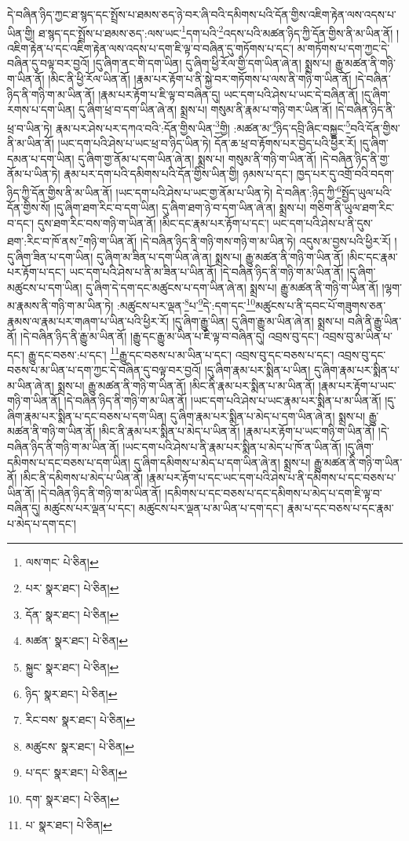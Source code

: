 དེ་བཞིན་ཉིད་ཀྱང་ཐ་སྙད་དང་སྤྲོས་པ་ཐམས་ཅད་ཉེ་བར་ཞི་བའི་དམིགས་པའི་དོན་གྱིས་འཇིག་རྟེན་ལས་འདས་པ་ཡིན་གྱི། ཐ་སྙད་དང་སྤྲོས་པ་ཐམས་ཅད་:ལས་ཡང་\footnote{ལས་གང་  པེ་ཅིན། }དག་པའི་\footnote{པར་  སྣར་ཐང་།  པེ་ཅིན། }འདས་པའི་མཚན་ཉིད་ཀྱི་དོན་གྱིས་ནི་མ་ཡིན་ནོ། །འཇིག་རྟེན་པ་དང་འཇིག་རྟེན་ལས་འདས་པ་དག་ཇི་ལྟ་བ་བཞིན་དུ་གཏོགས་པ་དང་། མ་གཏོགས་པ་དག་ཀྱང་དེ་བཞིན་དུ་བལྟ་བར་བྱའོ། །དུ་ཞིག་ནང་གི་དག་ཡིན། དུ་ཞིག་ཕྱི་རོལ་གྱི་དག་ཡིན་ཞེ་ན། སྨྲས་པ། རྒྱུ་མཚན་ནི་གཉི་ག་ཡིན་ནོ། །མིང་ནི་ཕྱི་རོལ་ཡིན་ནོ། །རྣམ་པར་རྟོག་པ་ནི་སྐྱེ་བར་གཏོགས་པ་ལས་ནི་གཉི་ག་ཡིན་ནོ། །དེ་བཞིན་ཉིད་ནི་གཉི་ག་མ་ཡིན་ནོ། །རྣམ་པར་རྟོག་པ་ཇི་ལྟ་བ་བཞིན་དུ། ཡང་དག་པའི་ཤེས་པ་ཡང་དེ་བཞིན་ནོ། །དུ་ཞིག་རགས་པ་དག་ཡིན། དུ་ཞིག་ཕྲ་བ་དག་ཡིན་ཞེ་ན། སྨྲས་པ། གསུམ་ནི་རྣམ་པ་གཉི་གར་ཡིན་ནོ། །དེ་བཞིན་ཉིད་ནི་ཕྲ་བ་ཡིན་ཏེ། རྣམ་པར་ཤེས་པར་དཀའ་བའི་:དོན་གྱིས་ཡིན་\footnote{དོན་  སྣར་ཐང་།  པེ་ཅིན། }གྱི། :མཚན་མ་\footnote{མཚན་  སྣར་ཐང་།  པེ་ཅིན། }ཉིད་དབྲི་ཞིང་བསྐྱུང་\footnote{སྐྱུང་  སྣར་ཐང་།  པེ་ཅིན། }བའི་དོན་གྱིས་ནི་མ་ཡིན་ནོ། །ཡང་དག་པའི་ཤེས་པ་ཡང་ཕྲ་བ་ཉིད་ཡིན་ཏེ། དོན་ཆ་ཕྲ་བ་རྟོགས་པར་བྱེད་པའི་ཕྱིར་རོ། །དུ་ཞིག་དམན་པ་དག་ཡིན། དུ་ཞིག་གྱ་ནོམ་པ་དག་ཡིན་ཞེ་ན། སྨྲས་པ། གསུམ་ནི་གཉི་ག་ཡིན་ནོ། །དེ་བཞིན་ཉིད་ནི་གྱ་ནོམ་པ་ཡིན་ཏེ། རྣམ་པར་དག་པའི་དམིགས་པའི་དོན་གྱིས་ཡིན་གྱི། ཉམས་པ་དང་། ཁྱད་པར་དུ་འགྲོ་བའི་བདག་ཉིད་ཀྱི་དོན་གྱིས་ནི་མ་ཡིན་ནོ། །ཡང་དག་པའི་ཤེས་པ་ཡང་གྱ་ནོམ་པ་ཡིན་ཏེ། དེ་བཞིན་:ཉིད་ཀྱི་\footnote{ཉིད་  སྣར་ཐང་།  པེ་ཅིན། }སྤྱོད་ཡུལ་པའི་དོན་གྱིས་སོ། །དུ་ཞིག་ཐག་རིང་བ་དག་ཡིན། དུ་ཞིག་ཐག་ཉེ་བ་དག་ཡིན་ཞེ་ན། སྨྲས་པ། གཅིག་ནི་ཡུལ་ཐག་རིང་བ་དང་། དུས་ཐག་རིང་བས་གཉི་ག་ཡིན་ནོ། །མིང་དང་རྣམ་པར་རྟོག་པ་དང་། ཡང་དག་པའི་ཤེས་པ་ནི་དུས་ཐག་:རིང་བ་ཁོ་ནས་\footnote{རིང་བས་  སྣར་ཐང་།  པེ་ཅིན། }གཉི་ག་ཡིན་ནོ། །དེ་བཞིན་ཉིད་ནི་གཉི་གས་གཉི་ག་མ་ཡིན་ཏེ། འདུས་མ་བྱས་པའི་ཕྱིར་རོ། །དུ་ཞིག་ཟིན་པ་དག་ཡིན། དུ་ཞིག་མ་ཟིན་པ་དག་ཡིན་ཞེ་ན། སྨྲས་པ། རྒྱུ་མཚན་ནི་གཉི་ག་ཡིན་ནོ། །མིང་དང་རྣམ་པར་རྟོག་པ་དང་། ཡང་དག་པའི་ཤེས་པ་ནི་མ་ཟིན་པ་ཡིན་ནོ། །དེ་བཞིན་ཉིད་ནི་གཉི་ག་མ་ཡིན་ནོ། །དུ་ཞིག་མཚུངས་པ་དག་ཡིན། དུ་ཞིག་དེ་དག་དང་མཚུངས་པ་དག་ཡིན་ཞེ་ན། སྨྲས་པ། རྒྱུ་མཚན་ནི་གཉི་ག་ཡིན་ནོ། །ལྷག་མ་རྣམས་ནི་གཉི་ག་མ་ཡིན་ཏེ། :མཚུངས་པར་ལྡན་\footnote{མཚུངས་  སྣར་ཐང་།  པེ་ཅིན། }པ་\footnote{པ་དང་  སྣར་ཐང་།  པེ་ཅིན། }དེ་:དག་དང་\footnote{དག་  སྣར་ཐང་།  པེ་ཅིན། }མཚུངས་པ་ནི་དབང་པོ་གཟུགས་ཅན་རྣམས་ལ་རྣམ་པར་གཞག་པ་ཡིན་པའི་ཕྱིར་རོ། །དུ་ཞིག་རྒྱུ་ཡིན། དུ་ཞིག་རྒྱུ་མ་ཡིན་ཞེ་ན། སྨྲས་པ། བཞི་ནི་རྒྱུ་ཡིན་ནོ། །དེ་བཞིན་ཉིད་ནི་རྒྱུ་མ་ཡིན་ནོ། །རྒྱུ་དང་རྒྱུ་མ་ཡིན་པ་ཇི་ལྟ་བ་བཞིན་དུ། འབྲས་བུ་དང་། འབྲས་བུ་མ་ཡིན་པ་དང་། རྒྱུ་དང་བཅས་:པ་དང་། \footnote{པ་  སྣར་ཐང་།  པེ་ཅིན། }རྒྱུ་དང་བཅས་པ་མ་ཡིན་པ་དང་། འབྲས་བུ་དང་བཅས་པ་དང་། འབྲས་བུ་དང་བཅས་པ་མ་ཡིན་པ་དག་ཀྱང་དེ་བཞིན་དུ་བལྟ་བར་བྱའོ། །དུ་ཞིག་རྣམ་པར་སྨིན་པ་ཡིན། དུ་ཞིག་རྣམ་པར་སྨིན་པ་མ་ཡིན་ཞེ་ན། སྨྲས་པ། རྒྱུ་མཚན་ནི་གཉི་ག་ཡིན་ནོ། །མིང་ནི་རྣམ་པར་སྨིན་པ་མ་ཡིན་ནོ། །རྣམ་པར་རྟོག་པ་ཡང་གཉི་ག་ཡིན་ནོ། །དེ་བཞིན་ཉིད་ནི་གཉི་ག་མ་ཡིན་ནོ། །ཡང་དག་པའི་ཤེས་པ་ཡང་རྣམ་པར་སྨིན་པ་མ་ཡིན་ནོ། །དུ་ཞིག་རྣམ་པར་སྨིན་པ་དང་བཅས་པ་དག་ཡིན། དུ་ཞིག་རྣམ་པར་སྨིན་པ་མེད་པ་དག་ཡིན་ཞེ་ན། སྨྲས་པ། རྒྱུ་མཚན་ནི་གཉི་ག་ཡིན་ནོ། །མིང་ནི་རྣམ་པར་སྨིན་པ་མེད་པ་ཡིན་ནོ། །རྣམ་པར་རྟོག་པ་ཡང་གཉི་ག་ཡིན་ནོ། །དེ་བཞིན་ཉིད་ནི་གཉི་ག་མ་ཡིན་ནོ། །ཡང་དག་པའི་ཤེས་པ་ནི་རྣམ་པར་སྨིན་པ་མེད་པ་ཁོ་ན་ཡིན་ནོ། །དུ་ཞིག་དམིགས་པ་དང་བཅས་པ་དག་ཡིན། དུ་ཞིག་དམིགས་པ་མེད་པ་དག་ཡིན་ཞེ་ན། སྨྲས་པ། རྒྱུ་མཚན་ནི་གཉི་ག་ཡིན་ནོ། །མིང་ནི་དམིགས་པ་མེད་པ་ཡིན་ནོ། །རྣམ་པར་རྟོག་པ་དང་ཡང་དག་པའི་ཤེས་པ་ནི་དམིགས་པ་དང་བཅས་པ་ཡིན་ནོ། །དེ་བཞིན་ཉིད་ནི་གཉི་ག་མ་ཡིན་ནོ། །དམིགས་པ་དང་བཅས་པ་དང་དམིགས་པ་མེད་པ་དག་ཇི་ལྟ་བ་བཞིན་དུ། མཚུངས་པར་ལྡན་པ་དང་། མཚུངས་པར་ལྡན་པ་མ་ཡིན་པ་དག་དང་། རྣམ་པ་དང་བཅས་པ་དང་རྣམ་པ་མེད་པ་དག་དང་། 